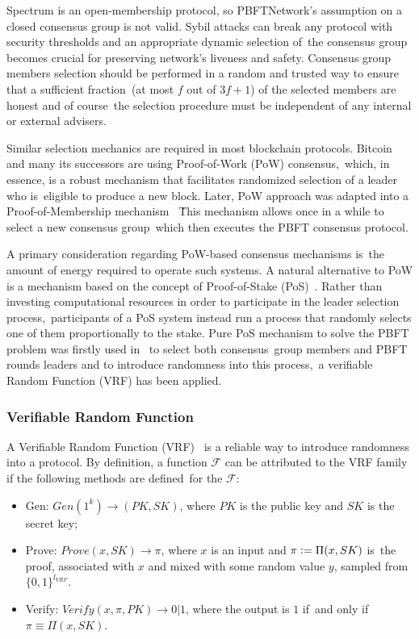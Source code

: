 Spectrum is an open-membership protocol, so PBFTNetwork's assumption on a closed consensus group is not valid.
Sybil attacks can break any protocol with security thresholds and an appropriate dynamic selection of\
the consensus group becomes crucial for preserving network's liveness and safety.
Consensus group members selection should be performed in a random and trusted way to ensure that a sufficient fraction\
(at most $f$ out of ${3 f + 1}$) of the selected members are honest and of course\
the selection procedure must be independent of any internal or external advisers.

Similar selection mechanics are required in most blockchain protocols.
Bitcoin~\cite{nakamoto2009bitcoin} and many its successors are using Proof-of-Work (PoW) consensus,\
which, in essence, is a robust mechanism that facilitates randomized selection of a leader who is\
eligible to produce a new block.
Later, PoW approach was adapted into a Proof-of-Membership mechanism ~\cite{kokoriskogias2016enhancing}\.
This mechanism allows once in a while to select a new consensus group\
which then executes the PBFT consensus protocol.

A primary consideration regarding PoW-based consensus mechanisms is\
the amount of energy required to operate such systems.
A natural alternative to PoW is a mechanism based on the concept of Proof-of-Stake (PoS)~\cite{King2012PPCoinPC}.
Rather than investing computational resources in order to participate in the leader selection process,\
participants of a PoS system instead run a process that randomly selects one of them proportionally to the stake.
Pure PoS mechanism to solve the PBFT problem was firstly used in~\cite{cryptoeprint:2017/454} to select both consensus\
group members and PBFT rounds leaders and to introduce randomness into this process,\
a verifiable Random Function (VRF) has been applied.

\subsubsection{Verifiable Random Function}

A Verifiable Random Function (VRF)~\cite{Micali1999} is a reliable way to introduce randomness into a protocol.
By definition, a function $\mathcal{F}$ can be attributed to the VRF family if the following methods are defined\
for the $\mathcal{F}$:
\begin{itemize}
    \item Gen: ${Gen(1^k) \rightarrow (PK, SK)}$, where $PK$ is the public key and $SK$ is the secret key;
    \item Prove: ${Prove(x, SK) \rightarrow \pi}$, where $x$ is an input and $\pi \vcentcolon= \Pi(x, SK)$ is\
    the proof, associated with $x$ and mixed with some random value $y$, sampled from $\{0,1\}^{l_{VRF}}$.
    \item Verify: ${Verify(x, \pi, PK) \rightarrow 0 | 1}$, where the output is $1$ if\
    and only if ${\pi \equiv \Pi(x, SK)}$.
\end{itemize}

